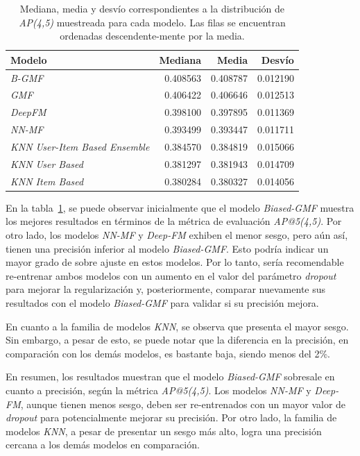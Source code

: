 \documentclass[11pt,a4paper,twoside]{thesis}
\begin{document}
\begin{table}[!htb]
	\centering
	\footnotesize
	\begin{tabular}{lrrr}
		\hline
		Modelo                                & Mediana  & Media    & Desvío   \\
		\hline
		\textit{B-GMF}                        & 0.408563 & 0.408787 & 0.012190 \\
		\textit{GMF}                          & 0.406422 & 0.406646 & 0.012513 \\
		\textit{DeepFM}                       & 0.398100 & 0.397895 & 0.011369 \\
		\textit{NN-MF}                        & 0.393499 & 0.393447 & 0.011711 \\
		\textit{KNN User-Item Based Ensemble} & 0.384570 & 0.384819 & 0.015066 \\
		\textit{KNN User Based}               & 0.381297 & 0.381943 & 0.014709 \\
		\textit{KNN Item Based}               & 0.380284 & 0.380327 & 0.014056 \\
		\hline
	\end{tabular}
	\caption{
		Mediana, media y desvío correspondientes a la distribución de
		\textit{AP(4,5)} muestreada para cada modelo.
		Las filas se encuentran ordenadas descendente-mente por la media.}
	\label{table:ap_at_k}
\end{table}

En la tabla~\ref{table:ap_at_k}, se puede observar inicialmente que el modelo
\textit{Biased-GMF} muestra los mejores resultados en términos de la métrica de
evaluación \textit{AP@5(4,5)}. Por otro lado, los modelos \textit{NN-MF} y
\textit{Deep-FM} exhiben el menor sesgo, pero aún así, tienen una precisión
inferior al modelo \textit{Biased-GMF}. Esto podría indicar un mayor grado de
sobre ajuste en estos modelos. Por lo tanto, sería recomendable re-entrenar
ambos modelos con un aumento en el valor del parámetro \textit{dropout} para
mejorar la regularización y, posteriormente, comparar nuevamente sus resultados
con el modelo \textit{Biased-GMF} para validar si su precisión mejora.

En cuanto a la familia de modelos \textit{KNN}, se observa que presenta el
mayor sesgo. Sin embargo, a pesar de esto, se puede notar que la diferencia en
la precisión, en comparación con los demás modelos, es bastante baja, siendo
menos del 2\%.

En resumen, los resultados muestran que el modelo \textit{Biased-GMF} sobresale
en cuanto a precisión, según la métrica \textit{AP@5(4,5)}. Los modelos
\textit{NN-MF} y \textit{Deep-FM}, aunque tienen menos sesgo, deben ser
re-entrenados con un mayor valor de \textit{dropout} para potencialmente
mejorar su precisión. Por otro lado, la familia de modelos \textit{KNN}, a
pesar de presentar un sesgo más alto, logra una precisión cercana a los demás
modelos en comparación.
\end{document}
